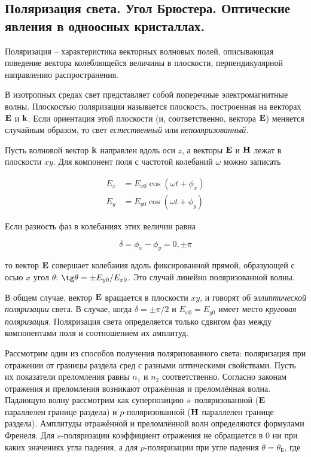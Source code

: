 \subsection{Поляризация света. Угол Брюстера. Оптические явления в одноосных кристаллах.}

\begin{definition}
    Поляризация -- характеристика векторных волновых полей, описывающая поведение вектора колеблющейся величины в плоскости, перпендикулярной направлению распространения.
\end{definition}

В изотропных средах свет представляет собой поперечные электромагнитные волны. Плоскостью поляризации называется плоскость, построенная на векторах $\mathbf E$ и $\mathbf k$. Если ориентация этой плоскости (и, соответственно, вектора $\mathbf E$) меняется случайным образом, то свет \textit{естественный} или \textit{неполяризованный}.

Пусть волновой вектор $\mathbf k$ направлен вдоль оси $z$, а векторы $\mathbf E$ и $\mathbf H$ лежат в плоскости $x y$. Для компонент поля с частотой колебаний $\omega$ можно записать

\begin{align}
    E_x &= E_{x 0} \cos \left( \omega t + \phi_x \right) \\
    E_y &= E_{y 0} \cos \left( \omega t + \phi_y \right)
\end{align}

Если разность фаз в колебаниях этих величин равна

\begin{equation}
    \delta = \phi_x - \phi_y = 0, \pm \pi
\end{equation}

\noindent
то вектор $\mathbf E$ совершает колебания вдоль фиксированной прямой, образующей с осью $x$ угол $\theta$: $\tg \theta = \pm E_{y 0} / E_{x 0}$. Это случай линейно поляризованной волны.

В общем случае, вектор $\mathbf E$ вращается в плоскости $x y$, и говорят об \textit{эллиптической поляризации} света. В случае, когда $\delta = \pm \pi / 2$ и $E_{x 0} = E_{y 0}$ имеет место \textit{круговая поляризация}. Поляризация света определяется только сдвигом фаз между компонентами поля и соотношением их амплитуд.

Рассмотрим один из способов получения поляризованного света: поляризация при отражении от границы раздела сред с разными оптическими свойствами. Пусть их показатели преломления равны $n_1$ и $n_2$ соответственно. Согласно законам отражения и преломления возникают отражённая и преломлённая волна. Падающую волну рассмотрим как суперпозицию $s$--поляризованной ($\mathbf E$ параллелен границе раздела) и $p$-поляризованной ($\mathbf H$ параллелен границе раздела). Амплитуды отражённой и преломлённой волн определяются формулами Френеля. Для $s$-поляризации коэффициент отражения не обращается в $0$ ни при каких значениях угла падения, а для $p$-поляризации при угле падения $\theta = \theta_\text{Б}$, где

